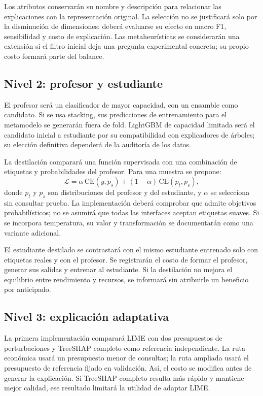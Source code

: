 Los atributos conservarán su nombre y descripción para relacionar las explicaciones con la representación original. La selección no se justificará solo por la disminución de dimensiones: deberá evaluarse su efecto en macro F1, sensibilidad y costo de explicación. Las metaheurísticas se considerarán una extensión si el filtro inicial deja una pregunta experimental concreta; su propio costo formará parte del balance.

\subsection{Nivel 2: profesor y estudiante}
El profesor será un clasificador de mayor capacidad, con un ensamble como candidato. Si se usa stacking, sus predicciones de entrenamiento para el metamodelo se generarán fuera de fold. LightGBM de capacidad limitada será el candidato inicial a estudiante por su compatibilidad con explicadores de árboles; su elección definitiva dependerá de la auditoría de los datos.

La destilación comparará una función supervisada con una combinación de etiquetas y probabilidades del profesor. Para una muestra se propone:
\begin{equation}
\mathcal{L}=\alpha\,\mathrm{CE}(y,p_s)+(1-\alpha)\,\mathrm{CE}(p_t,p_s),
\end{equation}
donde $p_t$ y $p_s$ son distribuciones del profesor y del estudiante, y $\alpha$ se selecciona sin consultar prueba. La implementación deberá comprobar que admite objetivos probabilísticos; no se asumirá que todas las interfaces aceptan etiquetas suaves. Si se incorpora temperatura, su valor y transformación se documentarán como una variante adicional.

El estudiante destilado se contrastará con el mismo estudiante entrenado solo con etiquetas reales y con el profesor. Se registrarán el costo de formar el profesor, generar sus salidas y entrenar al estudiante. Si la destilación no mejora el equilibrio entre rendimiento y recursos, se informará sin atribuirle un beneficio por anticipado.

\subsection{Nivel 3: explicación adaptativa}
La primera implementación comparará LIME con dos presupuestos de perturbaciones y TreeSHAP completo como referencia independiente. La ruta económica usará un presupuesto menor de consultas; la ruta ampliada usará el presupuesto de referencia fijado en validación. Así, el costo se modifica antes de generar la explicación. Si TreeSHAP completo resulta más rápido y mantiene mejor calidad, ese resultado limitará la utilidad de adaptar LIME.

